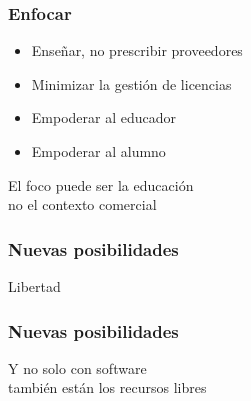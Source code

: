 \documentclass[17pt,aspectratio=169]{beamer}
\begin{document}

\begin{frame}
\frametitle{Enfocar}

\begin{itemize}
\item Enseñar, no prescribir proveedores
\item Minimizar la gestión de licencias
\item Empoderar al educador
\item Empoderar al alumno
\end{itemize}

\begin{flushright}
  El foco puede ser la educación \\
  no el contexto comercial \\
\end{flushright}
\end{frame}



\begin{frame}
\frametitle{Nuevas posibilidades}


{\Huge
\begin{center}
Libertad
\end{center}
}

\end{frame}


\begin{frame}
\frametitle{Nuevas posibilidades}


{\Large
\begin{center}
Y no solo con software \\
también están los recursos libres \\
\end{center}
}

\end{frame}


\end{document}
